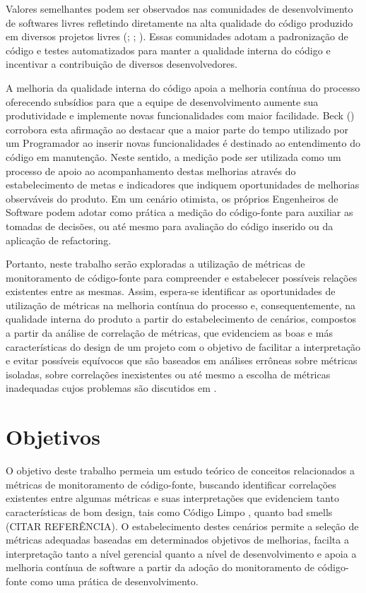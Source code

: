 %

Valores semelhantes podem ser observados nas comunidades de desenvolvimento de softwares livres refletindo diretamente na alta qualidade do código produzido em diversos projetos livres (\cite{schmidt2001}; \cite{halloran2002}; \cite{michlmayr2000}). Essas comunidades adotam a padronização de código e testes automatizados para manter a qualidade interna do código e incentivar a contribuição de diversos desenvolvedores.

%
A melhoria da qualidade interna do código apoia a melhoria contínua do processo oferecendo subsídios para que a equipe de desenvolvimento aumente sua produtividade e implemente novas funcionalidades com maior facilidade. Beck (\citeyear{beck2007}) corrobora esta afirmação ao destacar que a maior parte do tempo utilizado por um Programador ao inserir novas funcionalidades é destinado ao entendimento do código em manutenção. Neste sentido, a medição pode ser utilizada como um processo de apoio ao acompanhamento destas melhorias através do estabelecimento de metas e indicadores que indiquem oportunidades de melhorias observáveis do produto. Em um cenário otimista, os próprios Engenheiros de Software podem adotar como prática a medição do código-fonte para auxiliar as tomadas de decisões, ou até mesmo para avaliação do código inserido ou da aplicação de refactoring.
%

Portanto, neste trabalho serão exploradas a utilização de métricas de monitoramento de código-fonte para compreender e estabelecer possíveis relações existentes entre as mesmas. Assim, espera-se identificar as oportunidades de utilização de métricas na melhoria contínua do processo e, consequentemente, na qualidade interna do produto a partir do estabelecimento de cenários, compostos a partir da análise de correlação de métricas, que evidenciem as boas e más características do design de um projeto com o objetivo de facilitar a interpretação e evitar possíveis equívocos que são baseados em análises errôneas sobre métricas isoladas, sobre correlações inexistentes ou até mesmo a escolha de métricas inadequadas cujos problemas são discutidos em \cite{chidamber1994}.


\section{Objetivos}

O objetivo deste trabalho permeia um estudo teórico de conceitos relacionados a métricas de monitoramento de código-fonte, buscando identificar correlações existentes entre algumas métricas e suas interpretações que evidenciem tanto características de bom design, tais como Código Limpo \cite{almeida1994}, quanto bad smells (CITAR REFERÊNCIA). O estabelecimento destes cenários permite a seleção de métricas adequadas baseadas em determinados objetivos de melhorias, facilta a interpretação tanto a nível gerencial quanto a nível de desenvolvimento e apoia a melhoria contínua de software a partir da adoção do monitoramento de código-fonte como uma prática de desenvolvimento.

